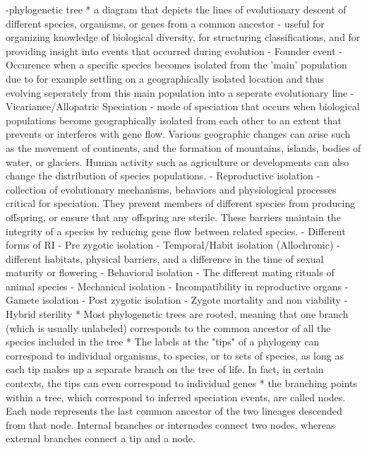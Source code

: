 -phylogenetic tree
    * a diagram that depicts the lines of evolutionary descent of different species, organisms, or genes from a common ancestor
        - useful for organizing knowledge of biological diversity, for structuring classifications, and for providing insight into events that occurred during evolution
        - Founder event
            - Occurence when a specific species becomes isolated from the 'main' population due to for example settling on a geographically isolated location and thus evolving seperately from this main population into a seperate evolutionary line
        - Vicariance/Allopatric Speciation
            - mode of speciation that occurs when biological populations become geographically isolated from each other to an extent that prevents or interferes with gene flow.
              Various geographic changes can arise such as the movement of continents, and the formation of mountains, islands, bodies of water, or glaciers. Human activity such as agriculture or developments can also change the distribution of species populations.
        - Reproductive isolation
            - collection of evolutionary mechanisms, behaviors and physiological processes critical for speciation. They prevent members of different species from producing offspring, or ensure that any offspring are sterile. These barriers maintain the integrity of a species by reducing gene flow between related species.
            - Different forms of RI 
                - Pre zygotic isolation
                    - Temporal/Habit isolation (Allochronic)
                        - different habitats, physical barriers, and a difference in the time of sexual maturity or flowering
                    - Behavioral isolation
                        - The different mating rituals of animal species
                    - Mechanical isolation
                        - Incompatibility in reproductive organs 
                    - Gamete isolation
                - Post zygotic isolation
                    - Zygote mortality and non viability
                    - Hybrid sterility
    * Most phylogenetic trees are rooted, meaning that one branch (which is usually unlabeled) corresponds to the common ancestor of all the species included in the tree
    * The labels at the "tips" of a phylogeny can correspond to individual organisms, to species, or to sets of species, as long as each tip makes up a separate branch on the tree of life. In fact, in certain contexts, the tips can even correspond to individual genes
    * the branching points within a tree, which correspond to inferred speciation events, are called nodes. Each node represents the last common ancestor of the two lineages descended from that node. Internal branches or internodes connect two nodes, whereas external branches connect a tip and a node. 

